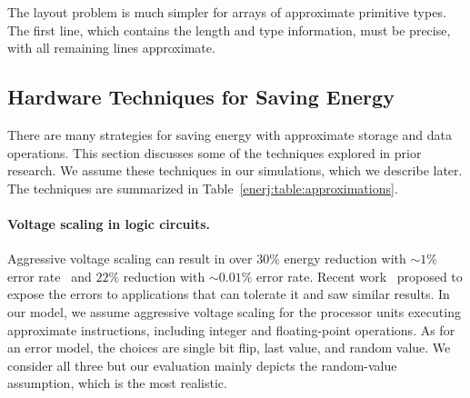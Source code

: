 The layout problem is much simpler for arrays of approximate primitive
types. The first line, which
contains the length and type information, must be precise, with all remaining
lines approximate.


\subsection{Hardware Techniques for Saving Energy }
\label{enerj:strategies}





There are many strategies for saving energy with approximate
storage and data operations. This section discusses some of the
techniques explored in prior research. We assume these techniques in
our simulations, which we describe later. The techniques are summarized
in Table~\ref{enerj:table:approximations}.


\paragraph{Voltage scaling in logic circuits.} Aggressive voltage
scaling can result in over $30\%$ energy reduction with
$\sim \! 1\%$ error rate~\cite{razor} and $22\%$ reduction with
$\sim \! 0.01\%$ error rate.  Recent work~\cite{hpca10cam,relax} proposed to
expose the errors to applications that can tolerate it and saw similar
results. In our model, we assume aggressive voltage scaling for the
processor units executing approximate instructions,
including integer and floating-point operations. As for an
error model, the choices are single bit flip, last value, and random
value. We consider all three but our evaluation mainly depicts the
random-value assumption, which is the most realistic.

